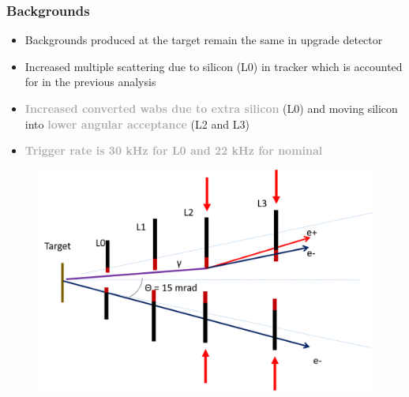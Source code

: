 \documentclass{beamer}
\begin{document}
\begin{frame}
\frametitle{Backgrounds}
\begin{itemize}
\item Backgrounds produced at the target remain the same in upgrade detector
\item Increased multiple scattering due to silicon (L0) in tracker which is accounted for in the previous analysis
\item \textcolor{darkgray}{\textbf{Increased converted wabs due to extra silicon}} (L0) and moving silicon into \textcolor{darkgray}{\textbf{lower angular acceptance}} (L2 and L3)
\item \textcolor{darkgray}{\textbf{Trigger rate is 30 kHz for L0 and 22 kHz for nominal}}
\end{itemize}
\begin{figure}
\includegraphics[width=0.5\linewidth]{figs/background_schematic.png}
\end{figure}

\end{frame}

\end{document}
